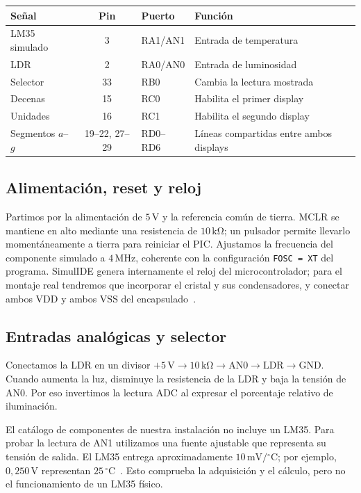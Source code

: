 \documentclass[11pt,a4paper]{article}
\begin{document}
\begin{center}
\small
\begin{tabularx}{\linewidth}{@{}lclX@{}}
\toprule
Señal & Pin & Puerto & Función \\
\midrule
LM35 simulado & 3 & RA1/AN1 & Entrada de temperatura \\
LDR & 2 & RA0/AN0 & Entrada de luminosidad \\
Selector & 33 & RB0 & Cambia la lectura mostrada \\
Decenas & 15 & RC0 & Habilita el primer display \\
Unidades & 16 & RC1 & Habilita el segundo display \\
Segmentos $a$--$g$ & 19--22, 27--29 & RD0--RD6 & Líneas compartidas entre ambos displays \\
\bottomrule
\end{tabularx}
\end{center}

\subsection{Alimentación, reset y reloj}

Partimos por la alimentación de \(5\,\mathrm V\) y la referencia común de tierra. MCLR se mantiene en alto mediante una resistencia de \(10\,\mathrm{k\Omega}\); un pulsador permite llevarlo momentáneamente a tierra para reiniciar el PIC. Ajustamos la frecuencia del componente simulado a \(4\,\mathrm{MHz}\), coherente con la configuración \texttt{FOSC = XT} del programa. SimulIDE genera internamente el reloj del microcontrolador; para el montaje real tendremos que incorporar el cristal y sus condensadores, y conectar ambos VDD y ambos VSS del encapsulado~\cite{simulide,pic}.

\subsection{Entradas analógicas y selector}

Conectamos la LDR en un divisor \(+5\,\mathrm V \rightarrow 10\,\mathrm{k\Omega} \rightarrow \mathrm{AN0} \rightarrow \mathrm{LDR} \rightarrow \mathrm{GND}\). Cuando aumenta la luz, disminuye la resistencia de la LDR y baja la tensión de AN0. Por eso invertimos la lectura ADC al expresar el porcentaje relativo de iluminación.

El catálogo de componentes de nuestra instalación no incluye un LM35. Para probar la lectura de AN1 utilizamos una fuente ajustable que representa su tensión de salida. El LM35 entrega aproximadamente \(10\,\mathrm{mV}/{}^\circ\mathrm C\); por ejemplo, \(0{,}250\,\mathrm V\) representan \(25\,{}^\circ\mathrm C\)~\cite{lm35}. Esto comprueba la adquisición y el cálculo, pero no el funcionamiento de un LM35 físico.
\end{document}

